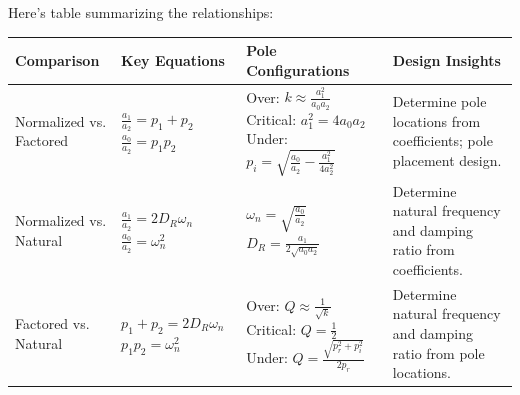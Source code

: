 Here's  table summarizing the relationships:
\begin{center}
  \begin{tabularx}{\linewidth}{|X|X|X|X|} \hline
    \textbf{Comparison} & \textbf{Key Equations} & \textbf{Pole Configurations} & \textbf{Design Insights} \\ \hline
    Normalized vs. Factored & \(\frac{a_1}{a_2} = p_1 + p_2\) \newline \(\frac{a_0}{a_2} = p_1 p_2\) & Over: \(k \approx \frac{a_1^2}{a_0 a_2}\) \newline Critical: \(a_1^2 = 4 a_0 a_2\) \newline Under: \(p_i = \sqrt{\frac{a_0}{a_2} - \frac{a_1^2}{4a_2^2}}\) & Determine pole locations from coefficients; pole placement design. \\ \hline
    Normalized vs. Natural & \(\frac{a_1}{a_2} = 2D_R\omega_n\) \newline \(\frac{a_0}{a_2} = \omega_n^2\) & \(\omega_n = \sqrt{\frac{a_0}{a_2}}\) \newline \(D_R = \frac{a_1}{2\sqrt{a_0 a_2}}\) & Determine natural frequency and damping ratio from coefficients. \\ \hline
    Factored vs. Natural & \(p_1 + p_2 = 2D_R\omega_n\) \newline \(p_1 p_2 = \omega_n^2\) & Over: \(Q \approx \frac{1}{\sqrt{k}}\) \newline Critical: \(Q = \frac{1}{2}\) \newline Under: \(Q = \frac{\sqrt{p_r^2 + p_i^2}}{2p_r}\) & Determine natural frequency and damping ratio from pole locations. \\ \hline
  \end{tabularx}
\end{center}

